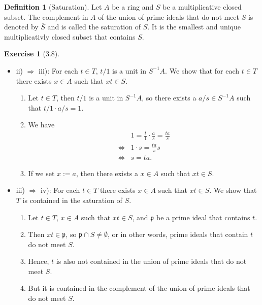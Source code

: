 \documentclass{book}
\theoremstyle{plain}
\theoremstyle{definition}
\newtheorem{exercise}[theorem]{Exercise}
\theoremstyle{custom_definition}
\newtheorem{definition}[theorem]{Definition}
\begin{document}
\begin{definition}[Saturation]
    Let \(A\) be a ring and \(S\) be a multiplicative closed subset. The complement in \(A\) of the union of prime ideals that do not meet \(S\) is denoted by \(\overline{S}\) and is called the saturation of \(S\). It is the smallest and unique multiplicativly closed subset that contains \(S\).
\end{definition}

\begin{exercise}[3.8]
    \begin{itemize}
        \item ii) \(\Rightarrow\) iii): For each \(t \in T\), \(t/1\) is a unit in \(S^{-1}A\). We show that for each \(t \in T\) there exists \(x \in A\) such that \(xt \in S\).
        \begin{enumerate}
            \item Let \(t \in T\), then \(t/1\) is a unit in \(S^{-1}A\), so there exists a \(a/s \in S^{-1}A\) such that \(t/1 \cdot a/s = 1\).
            \item We have
            \begin{align}
                & 1 = \frac{t}{1} \cdot \frac{a}{s} = \frac{t a}{s} \\
                \iff & 1 \cdot s = \frac{t a}{s} s \\
                \iff & s = t a \text{.}
            \end{align}
            \item If we set \(x := a\), then there exists a \(x \in A\) such that \(xt \in S\).
        \end{enumerate}
        \item iii) \(\Rightarrow\) iv): For each \(t \in T\) there exists \(x \in A\) such that \(xt \in S\). We show that \(T\) is contained in the saturation of \(S\).
        \begin{enumerate}
            \item Let \(t \in T\), \(x \in A\) such that \(xt \in S\), and \(\mathfrak{p}\) be a prime ideal that contains \(t\).
            \item Then \(xt \in \mathfrak{p}\), so \(\mathfrak{p} \cap S \neq \emptyset\), or in other words, prime ideals that contain \(t\) do not meet \(S\).
            \item Hence, \(t\) is also not contained in the union of prime ideals that do not meet \(S\).
            \item But it is contained in the complement of the union of prime ideals that do not meet \(S\).

\end{enumerate}
\end{itemize}
\end{exercise}
\end{document}
